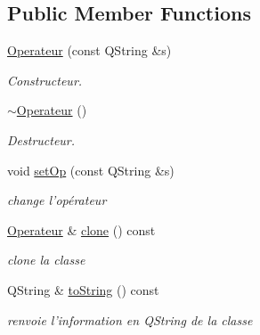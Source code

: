 \subsection*{Public Member Functions}
\begin{DoxyCompactItemize}
\item 
\hyperlink{classNombre_1_1Operateur_a9a922f3e82e5a505ba03c7a7e9ce102f}{Operateur} (const QString \&s)
\begin{DoxyCompactList}\small\item\em Constructeur. \item\end{DoxyCompactList}\item 
\hyperlink{classNombre_1_1Operateur_a65f4226509f0cf55a129a08693b7dfcd}{$\sim$Operateur} ()
\begin{DoxyCompactList}\small\item\em Destructeur. \item\end{DoxyCompactList}\item 
void \hyperlink{classNombre_1_1Operateur_a6dffb3f48b67f10ad0f4b629d35086ab}{setOp} (const QString \&s)
\begin{DoxyCompactList}\small\item\em change l'opérateur \item\end{DoxyCompactList}\item 
\hypertarget{classNombre_1_1Operateur_acf0dfeeb1249a1adf4a79df18e7f5395}{
\hyperlink{classNombre_1_1Operateur}{Operateur} \& \hyperlink{classNombre_1_1Operateur_acf0dfeeb1249a1adf4a79df18e7f5395}{clone} () const }
\label{classNombre_1_1Operateur_acf0dfeeb1249a1adf4a79df18e7f5395}

\begin{DoxyCompactList}\small\item\em clone la classe \item\end{DoxyCompactList}\item 
\hypertarget{classNombre_1_1Operateur_ae037f698338fb148d2e35aab60a688b8}{
QString \& \hyperlink{classNombre_1_1Operateur_ae037f698338fb148d2e35aab60a688b8}{toString} () const }
\label{classNombre_1_1Operateur_ae037f698338fb148d2e35aab60a688b8}

\begin{DoxyCompactList}\small\item\em renvoie l'information en QString de la classe \item\end{DoxyCompactList}\end{DoxyCompactItemize}
